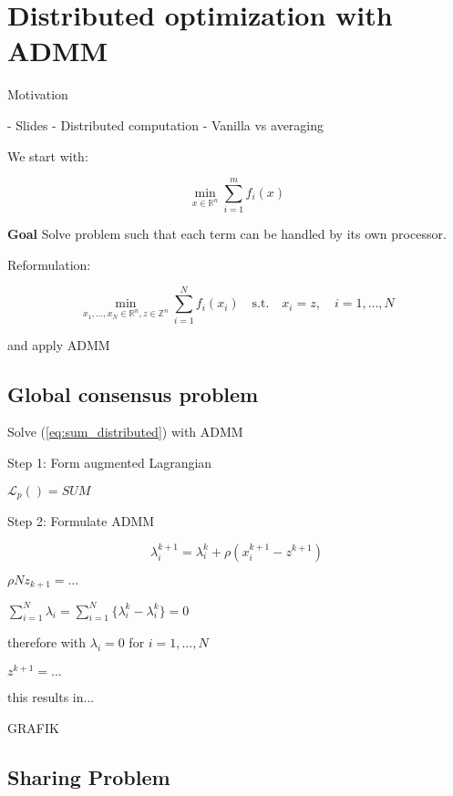 \section{Distributed optimization with ADMM}

Motivation

- Slides
- Distributed computation
- Vanilla vs averaging

We start with:

$$	\min_{x \in \mathbb{R}^{n}} \sum_{i = 1}^{m} f_i(x) $$

\textbf{Goal} Solve problem such that each term can be handled by its own processor.

Reformulation:


\begin{equation}
	\min_{x_1,\dots,x_N \in \mathbb{R}^{n}, z \in \mathbb{Z}^{n}} \sum_{i = 1}^{N} f_i(x_i)
	\quad\text{s.t.}\quad x_i = z,\quad i = 1,\dots,N
	\label{eq:sum_distributed}
\end{equation}

and apply ADMM

\subsection{Global consensus problem}

Solve (\ref{eq:sum_distributed}) with ADMM

Step 1: Form augmented Lagrangian

$\mathcal{L}_p()=SUM$

Step 2: Formulate ADMM

%
%
$$ \lambda_i^{k+1}=\lambda_i^k+\rho(x_i^{k+1}-z^{k+1})$$

$\rho N z_{k+1} =\dots$

$\sum_{i = 1}^{N} \lambda_i = \sum_{i = 1}^{N}\{\lambda_i^k-\lambda_i^k\}=0$

therefore with $\lambda_i = 0$ for $i=1,\dots,N$

$z^{k+1} = ...$

this results in...

GRAFIK

\subsection{Sharing Problem}

